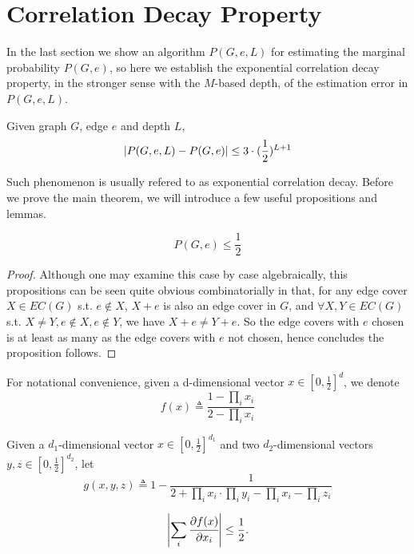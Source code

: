 \section{Correlation Decay Property}

In the last section we show an algorithm $P(G,e,L)$ for estimating the marginal probability $P(G,e)$,
so here we establish the exponential correlation decay property, in the stronger sense with the $M$-based depth, of the estimation error in $P(G,e,L)$.%

\begin{Thm}
	Given graph $G$, edge $e$ and depth $L$,
	\[\left\vert P(G,e,L) - P(G,e)\right\vert \leq 3\cdot(\frac{1}{2})^{L+1}\]
\end{Thm}

Such phenomenon is usually refered to as exponential correlation decay. Before we prove the main theorem, we will introduce a few useful propositions and lemmas.

\begin{Prop}
	\[P(G, e) \leq \frac{1}{2}\]
\end{Prop}

\begin{proof}
	Although one may examine this case by case algebraically, this propositions can be seen quite obvious combinatorially in that, for any edge cover $X \in EC(G)$ s.t. $e \notin X$, $X+e$ is also an edge cover in $G$, and $\forall X,Y \in EC(G)$ s.t. $X \neq Y, e \notin X, e\notin Y$, we have $X+e \neq Y+e$. So the edge covers with $e$ chosen is at least as many as the edge covers with $e$ not chosen, hence concludes the proposition follows.
\end{proof}

For notational convenience, given a d-dimensional vector $x \in [0, \frac{1}{2}]^d$, we denote
\[ f(x) \triangleq \frac{1- \prod_i x_i}{2 - \prod_i x_i}\]

Given a $d_1$-dimensional vector $x \in [0, \frac{1}{2}]^{d_1}$ and two $d_2$-dimensional vectors $y,z \in [0, \frac{1}{2}]^{d_2}$, let
\[ g(x,y,z) \triangleq  1- \frac{1}{2+\prod_i x_i \cdot \prod_i y_i - \prod_i x_i - \prod_i z_i} \]


	\begin{Lem}
		\begin{align*}
			\left\vert\sum_i \cfrac{\partial f(x)}{\partial x_i}\right\vert \leq \frac{1}{2}. 
		\end{align*}
	\end{Lem}

